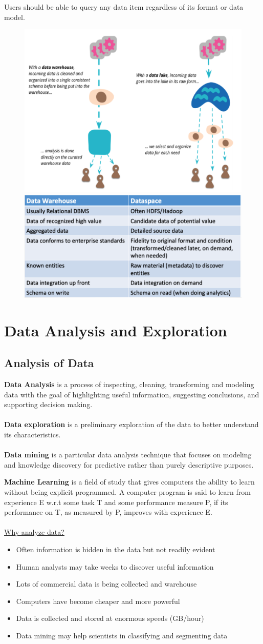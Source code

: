 \documentclass[10pt,a4paper]{article}
\newcommand{\nline}{\\~\\}
\begin{document}
Users should be able to query any data item regardless of its format or data model.
\begin{figure}[htp]
\centering
\includegraphics[width=.5\textwidth]{images/data-spaces}\hfill
\includegraphics[width=.5\textwidth]{images/data-spaces-vs-dw}\hfill
\end{figure}
\pagebreak
\section{Data Analysis and Exploration}
\subsection{Analysis of Data}
\textbf{Data Analysis} is a process of inspecting, cleaning, transforming and modeling data with the goal of highlighting useful information, suggesting conclusions, and supporting decision making.
\nline
\textbf{Data exploration} is a preliminary exploration of the data to better understand its characteristics.
\nline
\textbf{Data mining} is a particular data analysis technique that focuses on modeling and knowledge discovery for predictive rather than purely descriptive purposes.

\textbf{Machine Learning} is a field of study that gives computers the ability to learn without being explicit programmed. A computer program is said to learn from experience E w.r.t some task T and some performance measure P, if its performance on T, as measured by P, improves with experience E.
\nline
\uline{Why analyze data?}
\begin{itemize}
	\item Often information is hidden in the data but not readily evident
	\item Human analysts may take weeks to discover useful information
	\item Lots of commercial data is being collected and warehouse
	\item Computers have become cheaper and more powerful
	\item Data is collected and stored at enormous speeds (GB/hour)
	\item Data mining may help scientists in classifying and segmenting data
\end{itemize}
\end{document}
